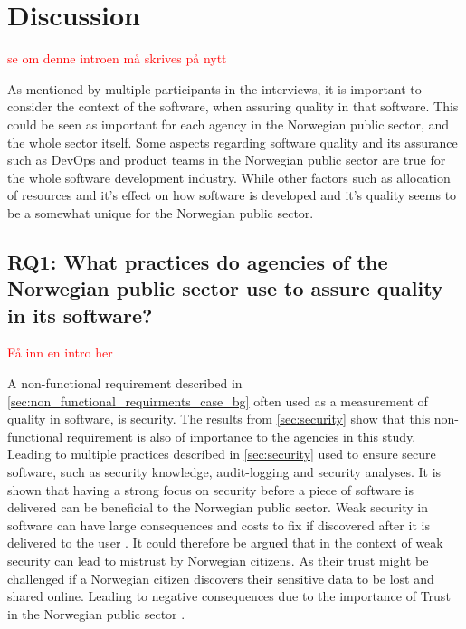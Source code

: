 \chapter{Discussion} \label{sec:discussion}

\textcolor{red}{se om denne introen må skrives på nytt}

As mentioned by multiple participants in the interviews, it is important to consider the context of the software, when assuring quality in that software. This could be seen as important for each agency in the Norwegian public sector, and the whole sector itself. Some aspects regarding software quality and its assurance such as DevOps and product teams in the Norwegian public sector are true for the whole software development industry. While other factors such as allocation of resources and it's effect on how software is developed and it's quality seems to be a somewhat unique for the Norwegian public sector.

\section{RQ1: What practices do agencies of the Norwegian public sector use to assure quality in its software?}

\textcolor{red}{Få inn en intro her}

A non-functional requirement described in \autoref{sec:non_functional_requirments_case_bg} often used as a measurement of quality in software, is security. The results from \autoref{sec:security} show that this non-functional requirement is also of importance to the agencies in this study. Leading to multiple practices described in \autoref{sec:security} used to ensure secure software, such as security knowledge, audit-logging and security analyses. It is shown that having a strong focus on security before a piece of software is delivered can be beneficial to the Norwegian public sector. Weak security in software can have large consequences and costs to fix if discovered after it is delivered to the user \cite{csw_2011}. It could therefore be argued that in the context of weak security can lead to mistrust by Norwegian citizens. As their trust might be challenged if a Norwegian citizen discovers their sensitive data to be lost and shared online. Leading to negative consequences due to the importance of Trust in the Norwegian public sector \cite{oecd_2022}.

